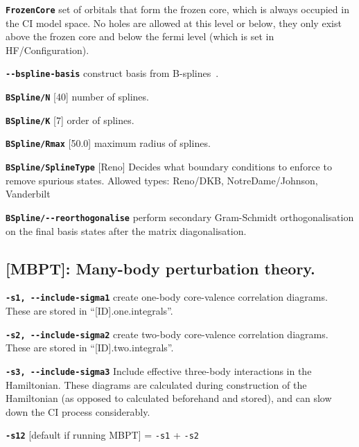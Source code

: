 \documentclass[a4paper,11pt]{article}
\newcommand{\option}[1]{\smallskip\noindent\textbf{\texttt{#1}}}
\begin{document}
\option{FrozenCore} set of orbitals that form the frozen core, which is always occupied in the CI model space. No holes are allowed at this level or below, they only exist above the frozen core and below the fermi level (which is set in HF/Configuration).

\option{-{}-bspline-basis} construct basis from B-splines~\cite{johnson88pra}.

\option{BSpline/N} [40] number of splines.

\option{BSpline/K} [7]  order of splines.

\option{BSpline/Rmax} [50.0] maximum radius of splines.

\option{BSpline/SplineType} [Reno] Decides what boundary conditions to enforce to remove spurious states. Allowed types: Reno/DKB, NotreDame/Johnson, Vanderbilt

\option{BSpline/-{}-reorthogonalise} perform secondary Gram-Schmidt orthogonalisation on the final basis states after the matrix diagonalisation.


\subsection{[MBPT]: Many-body perturbation theory.}

\option{-s1, -{}-include-sigma1} create one-body core-valence correlation diagrams. These are stored in ``[ID].one.integrals''.

\option{-s2, -{}-include-sigma2} create two-body core-valence correlation diagrams. These are stored in ``[ID].two.integrals''.

\option{-s3, -{}-include-sigma3} Include effective three-body interactions in the Hamiltonian. These diagrams are calculated during construction of the Hamiltonian (as opposed to calculated beforehand and stored), and can slow down the CI process considerably.

\option{-s12} [default if running MBPT] = \texttt{-s1} + \texttt{-s2}
\end{document}
